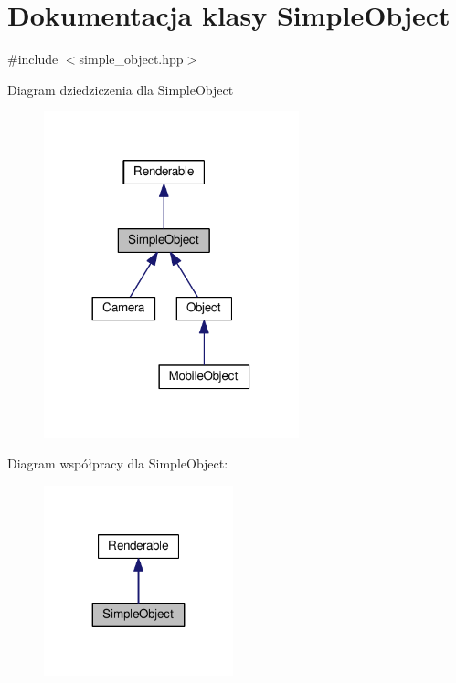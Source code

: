 \hypertarget{class_simple_object}{}\section{Dokumentacja klasy Simple\+Object}
\label{class_simple_object}


{\ttfamily \#include $<$simple\+\_\+object.\+hpp$>$}



Diagram dziedziczenia dla Simple\+Object
\nopagebreak
\begin{figure}[H]
\begin{center}
\leavevmode
\includegraphics[width=209pt]{class_simple_object__inherit__graph}
\end{center}
\end{figure}


Diagram współpracy dla Simple\+Object\+:
\nopagebreak
\begin{figure}[H]
\begin{center}
\leavevmode
\includegraphics[width=155pt]{class_simple_object__coll__graph}
\end{center}
\end{figure}
